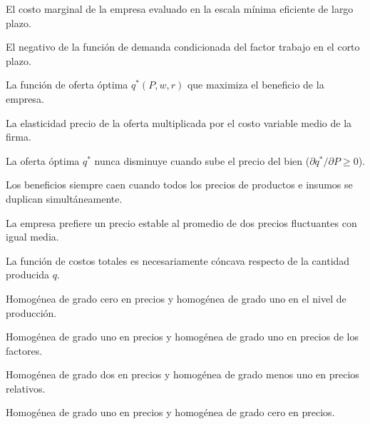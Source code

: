 \begin{opts}
    \item El costo marginal de la empresa evaluado en la escala mínima eficiente de largo plazo.
    \item El negativo de la función de demanda condicionada del factor trabajo en el corto plazo.
    \item La función de oferta óptima $q^*(P, w, r)$ que maximiza el beneficio de la empresa.
    \item La elasticidad precio de la oferta multiplicada por el costo variable medio de la firma.
\end{opts}

\begin{opts}
    \item La oferta óptima $q^*$ nunca disminuye cuando sube el precio del bien ($\partial q^*/\partial P \ge 0$).
    \item Los beneficios siempre caen cuando todos los precios de productos e insumos se duplican simultáneamente.
    \item La empresa prefiere un precio estable al promedio de dos precios fluctuantes con igual media.
    \item La función de costos totales es necesariamente cóncava respecto de la cantidad producida $q$.
\end{opts}

\begin{opts}
    \item Homogénea de grado cero en precios y homogénea de grado uno en el nivel de producción.
    \item Homogénea de grado uno en precios y homogénea de grado uno en precios de los factores.
    \item Homogénea de grado dos en precios y homogénea de grado menos uno en precios relativos.
    \item Homogénea de grado uno en precios y homogénea de grado cero en precios.
\end{opts}

